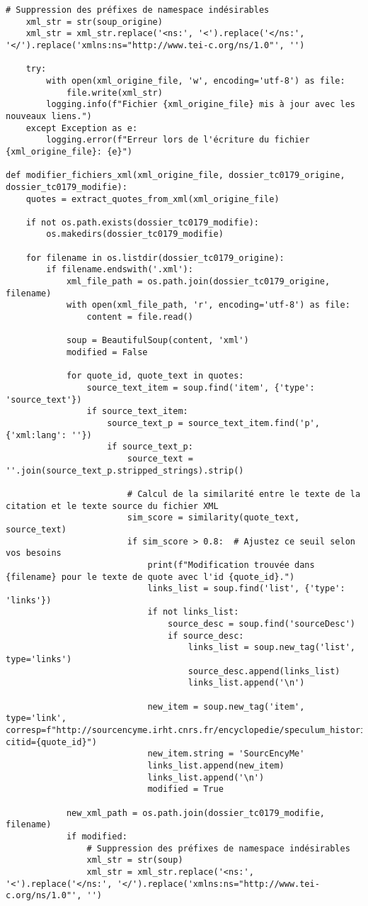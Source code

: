 \begin{lstlisting}[breaklines=true]
	# Suppression des préfixes de namespace indésirables
	xml_str = str(soup_origine)
	xml_str = xml_str.replace('<ns:', '<').replace('</ns:', '</').replace('xmlns:ns="http://www.tei-c.org/ns/1.0"', '')
	
	try:
		with open(xml_origine_file, 'w', encoding='utf-8') as file:
			file.write(xml_str)
		logging.info(f"Fichier {xml_origine_file} mis à jour avec les nouveaux liens.")
	except Exception as e:
		logging.error(f"Erreur lors de l'écriture du fichier {xml_origine_file}: {e}")
	
def modifier_fichiers_xml(xml_origine_file, dossier_tc0179_origine, dossier_tc0179_modifie):
	quotes = extract_quotes_from_xml(xml_origine_file)
	
	if not os.path.exists(dossier_tc0179_modifie):
		os.makedirs(dossier_tc0179_modifie)
	
	for filename in os.listdir(dossier_tc0179_origine):
		if filename.endswith('.xml'):
			xml_file_path = os.path.join(dossier_tc0179_origine, filename)
			with open(xml_file_path, 'r', encoding='utf-8') as file:
				content = file.read()
	
			soup = BeautifulSoup(content, 'xml')
			modified = False
	
			for quote_id, quote_text in quotes:
				source_text_item = soup.find('item', {'type': 'source_text'})
				if source_text_item:
					source_text_p = source_text_item.find('p', {'xml:lang': ''})
					if source_text_p:
						source_text = ''.join(source_text_p.stripped_strings).strip()
	
						# Calcul de la similarité entre le texte de la citation et le texte source du fichier XML
						sim_score = similarity(quote_text, source_text)
						if sim_score > 0.8:  # Ajustez ce seuil selon vos besoins
							print(f"Modification trouvée dans {filename} pour le texte de quote avec l'id {quote_id}.")
							links_list = soup.find('list', {'type': 'links'})
							if not links_list:
								source_desc = soup.find('sourceDesc')
								if source_desc:
									links_list = soup.new_tag('list', type='links')
									source_desc.append(links_list)
									links_list.append('\n')
	
							new_item = soup.new_tag('item', type='link', corresp=f"http://sourcencyme.irht.cnrs.fr/encyclopedie/speculum_historiale_version_sm_trifaria_ms_douai_bm_797?citid={quote_id}")
							new_item.string = 'SourcEncyMe'
							links_list.append(new_item)
							links_list.append('\n')
							modified = True
	
			new_xml_path = os.path.join(dossier_tc0179_modifie, filename)
			if modified:
				# Suppression des préfixes de namespace indésirables
				xml_str = str(soup)
				xml_str = xml_str.replace('<ns:', '<').replace('</ns:', '</').replace('xmlns:ns="http://www.tei-c.org/ns/1.0"', '')
	

\end{lstlisting}
